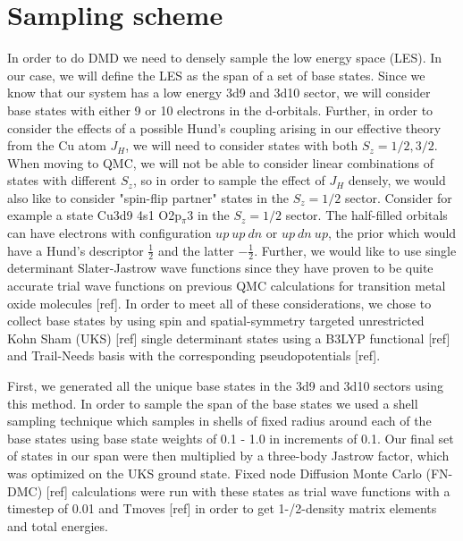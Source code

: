 \documentclass{article}
\begin{document}
\section{Sampling scheme}
In order to do DMD we need to densely sample the low energy space (LES). In our case, we will define the LES as the span of a set of base states. Since we know that our system has a low energy 3d9 and 3d10 sector, we will consider base states with either 9 or 10 electrons in the d-orbitals. Further, in order to consider the effects of a possible Hund's coupling arising in our effective theory from the Cu atom $J_H$, we will need to consider states with both $S_z=1/2, 3/2$. When moving to QMC, we will not be able to consider linear combinations of states with different $S_z$, so in order to sample the effect of $J_H$ densely, we would also like to consider "spin-flip partner" states in the $S_z=1/2$ sector. Consider for example a state Cu3d9\! 4s1 O2p$_{\pi}$3 in the $S_z=1/2$ sector. The half-filled orbitals can have electrons with configuration $up\ up\ dn$ or $up\ dn\ up$, the prior which would have a Hund's descriptor $\frac{1}{2}$ and the latter $-\frac{1}{2}$. Further, we would like to use single determinant Slater-Jastrow wave functions since they have proven to be quite accurate trial wave functions on previous QMC calculations for transition metal oxide molecules [ref]. In order to meet all of these considerations, we chose to collect base states by using spin and spatial-symmetry targeted unrestricted Kohn Sham (UKS) [ref] single determinant states using a B3LYP functional [ref] and Trail-Needs basis with the corresponding pseudopotentials [ref]. 

First, we generated all the unique base states in the 3d9 and 3d10 sectors using this method. In order to sample the span of the base states we used a shell sampling technique which samples in shells of fixed radius around each of the base states using base state weights of 0.1 - 1.0 in increments of 0.1. Our final set of states in our span were then multiplied by a three-body Jastrow factor, which was optimized on the UKS ground state. Fixed node Diffusion Monte Carlo (FN-DMC) [ref] calculations were run with these states as trial wave functions with a timestep of 0.01 and Tmoves [ref]  in order to get 1-/2-density matrix elements and total energies.
\end{document}
